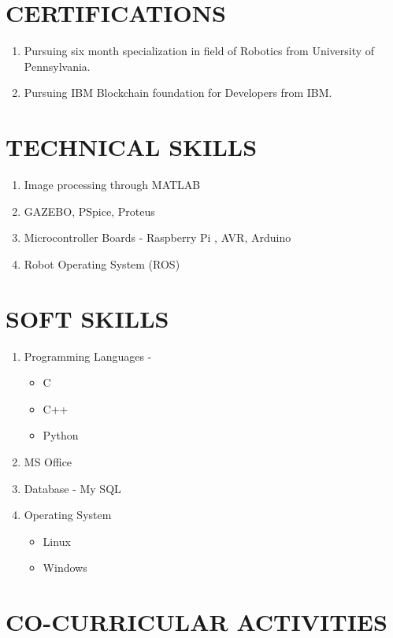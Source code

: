 \documentclass[margin,line]{res}
\begin{document}
\begin{resume}
\section{\sc CERTIFICATIONS}
\begin{enumerate}

\item Pursuing six month specialization in field of Robotics from University of Pennsylvania.
\item Pursuing IBM Blockchain foundation for Developers from IBM.
\end{enumerate}
\section{\sc TECHNICAL SKILLS}
\begin{enumerate}
\item Image processing through MATLAB
\item GAZEBO, PSpice, Proteus
\item Microcontroller Boards - Raspberry Pi , AVR, Arduino
\item Robot Operating System (ROS)
\end{enumerate}
\section{\sc SOFT SKILLS}

\begin{enumerate}
\item Programming Languages - 
\begin{itemize}
\item C \item C++ \item Python
\end{itemize}

\item MS Office
\item Database {-} My SQL
\item Operating System
\begin{itemize}
\item Linux
\item Windows
\end{itemize}
\end{enumerate}

\section{\sc CO-CURRICULAR ACTIVITIES}


\end{resume}
\end{document}
